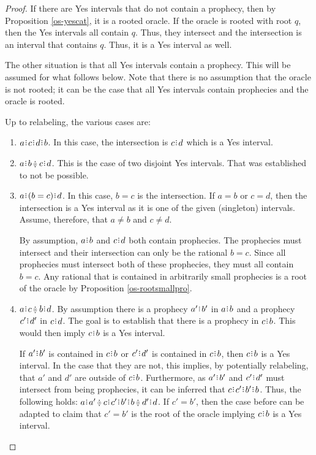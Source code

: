 \documentclass[12pt]{article}
\begin{document}
\begin{proof}
    If there are Yes intervals that do not contain a prophecy, then by Proposition \ref{os-yescat}, it is a rooted oracle. If the oracle is rooted with root $q$, then the Yes intervals all contain $q$. Thus, they intersect and the intersection is an interval that contains $q$. Thus, it is a Yes interval as well. 

    The other situation is that all Yes intervals contain a prophecy. This will be assumed for what follows below. Note that there is no assumption that the oracle is not rooted; it can be the case that all Yes intervals contain prophecies and  the oracle is rooted. 

    Up to relabeling, the various cases are:  
    \begin{enumerate}
        \item $a\rint c\rint d\rint b$. In this case, the intersection is $c\rint d$ which is a Yes interval. 
        \item $a\rint b \betneq c\rint d$. This is the case of two disjoint Yes intervals. That was established to not be possible. 


        \item $a\rint (b=c)\rint d$. In this case, $b=c$ is the intersection.  If $a=b$ or $c=d$, then the intersection is a Yes interval as it is one of the given (singleton) intervals. Assume, therefore, that $a \neq b$ and $c \neq d$. 
        
        By assumption, $a\rint b$ and $c\rint d$ both contain prophecies. The prophecies must intersect and their intersection can only be the rational $b=c$. Since all prophecies must intersect both of these prophecies, they must all contain $b=c$. Any rational that is  contained in arbitrarily small prophecies is a root of the oracle by Proposition \ref{os-rootsmallpro}.
        
        \item $a\rint c \betneq b\rint d$. By assumption there is a prophecy $a'\rint b'$ in $a\rint b$ and a prophecy $c'\rint d'$ in $c\rint d$. The goal is to establish that there is a prophecy in $c\rint b$. This would then imply $c\rint b$ is a Yes interval. 
        
        If $a'\rint b'$ is contained in $c\rint b$ or $c'\rint d'$ is contained in $c\rint b$, then $c\rint b$ is a Yes interval. In the case that they are not, this implies, by potentially relabeling, that $a'$ and $d'$ are outside of $c\rint b$. Furthermore, as  $a'\rint b'$ and $c'\rint d'$ must intersect from being prophecies, it can be inferred that $c\rint c'\rint b'\rint b$. Thus, the following holds:   $a\rint a' \betneq c\rint c'\rint b'\rint b \betneq d'\rint d$. If $c'=b'$, then the case before can be adapted to claim that $c'=b'$ is the root of the oracle implying $c\rint b$ is a Yes interval. 


\end{enumerate}
\end{proof}
\end{document}
